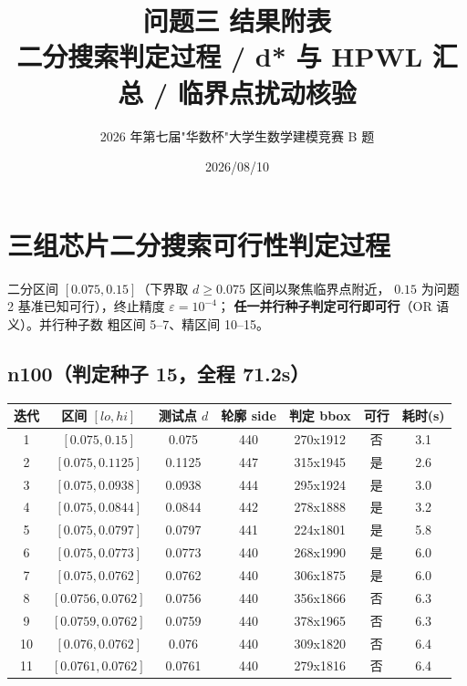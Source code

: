 \documentclass[12pt,a4paper]{article}
\title{\textbf{问题三 结果附表}\\[6pt]
\large 二分搜索判定过程 / d* 与 HPWL 汇总 / 临界点扰动核验}
\author{2026 年第七届"华数杯"大学生数学建模竞赛 B 题}
\date{2026/08/10}
\begin{document}
\maketitle

\section{三组芯片二分搜索可行性判定过程}

二分区间 $[0.075, 0.15]$（下界取 $d \ge 0.075$ 区间以聚焦临界点附近，
$0.15$ 为问题 2 基准已知可行），终止精度 $\varepsilon = 10^{-4}$；
\textbf{任一并行种子判定可行即可行}（OR 语义）。并行种子数
粗区间 5--7、精区间 10--15。

\subsection{n100（判定种子 15，全程 71.2s）}
\begin{table}[H]
\centering
\scriptsize
\setlength{\tabcolsep}{2.5pt}
\begin{tabular}{ccccccc}
\toprule
迭代 & 区间 $[lo, hi]$ & 测试点 $d$ & 轮廓 side & 判定 bbox & 可行 & 耗时(s) \\
\midrule
1 & $[0.075,0.15]$ & 0.075 & 440 & 270x1912 & 否 & 3.1 \\
2 & $[0.075,0.1125]$ & 0.1125 & 447 & 315x1945 & 是 & 2.6 \\
3 & $[0.075,0.0938]$ & 0.0938 & 444 & 295x1924 & 是 & 3.0 \\
4 & $[0.075,0.0844]$ & 0.0844 & 442 & 278x1888 & 是 & 3.2 \\
5 & $[0.075,0.0797]$ & 0.0797 & 441 & 224x1801 & 是 & 5.8 \\
6 & $[0.075,0.0773]$ & 0.0773 & 440 & 268x1990 & 是 & 6.0 \\
7 & $[0.075,0.0762]$ & 0.0762 & 440 & 306x1875 & 是 & 6.0 \\
8 & $[0.0756,0.0762]$ & 0.0756 & 440 & 356x1866 & 否 & 6.3 \\
9 & $[0.0759,0.0762]$ & 0.0759 & 440 & 378x1965 & 否 & 6.3 \\
10 & $[0.076,0.0762]$ & 0.076 & 440 & 309x1820 & 否 & 6.4 \\
11 & $[0.0761,0.0762]$ & 0.0761 & 440 & 279x1816 & 否 & 6.4 \\
\bottomrule
\end{tabular}
\end{table}
\end{document}
